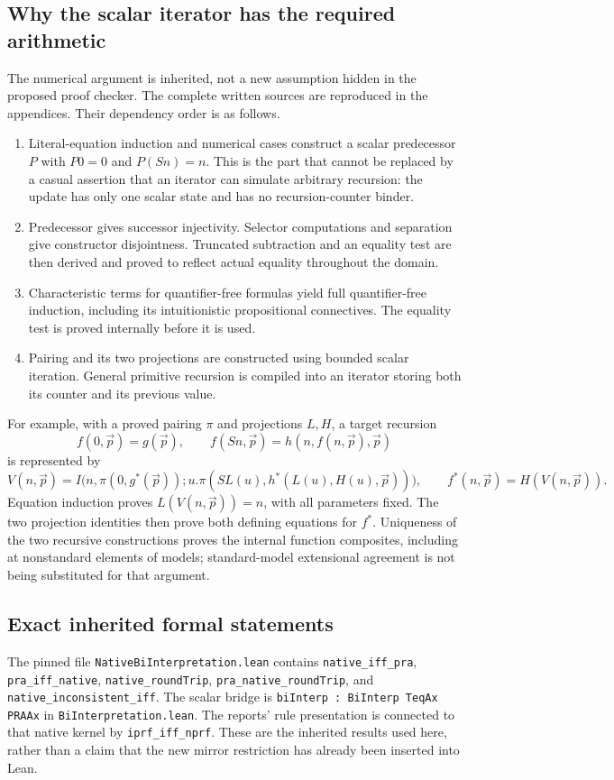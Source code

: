 \subsection{Why the scalar iterator has the required arithmetic}
The numerical argument is inherited, not a new assumption hidden in
the proposed proof checker.  The complete written sources are
reproduced in the appendices.  Their dependency order is as follows.
\begin{enumerate}
\item Literal-equation induction and numerical cases construct a
scalar predecessor $P$ with $P0=0$ and $P(Sn)=n$.  This is the part
that cannot be replaced by a casual assertion that an iterator can
simulate arbitrary recursion: the update has only one scalar state
and has no recursion-counter binder.
\item Predecessor gives successor injectivity.  Selector computations
and separation give constructor disjointness.  Truncated subtraction
and an equality test are then derived and proved to reflect actual
equality throughout the domain.
\item Characteristic terms for quantifier-free formulas yield full
quantifier-free induction, including its intuitionistic propositional
connectives.  The equality test is proved internally before it is used.
\item Pairing and its two projections are constructed using bounded
scalar iteration.  General primitive recursion is compiled into an
iterator storing both its counter and its previous value.
\end{enumerate}
For example, with a proved pairing $\pi$ and projections $L,H$, a
target recursion
\[
 f(0,\vec p)=g(\vec p),\qquad
 f(Sn,\vec p)=h(n,f(n,\vec p),\vec p)
\]
is represented by
\[
 V(n,\vec p)=I\bigl(n,\pi(0,g^*(\vec p));
   u.\pi(SL(u),h^*(L(u),H(u),\vec p))\bigr),
 \qquad f^*(n,\vec p)=H(V(n,\vec p)).
\]
Equation induction proves $L(V(n,\vec p))=n$, with all parameters
fixed.  The two projection identities then prove both defining
equations for $f^*$.  Uniqueness of the two recursive constructions
proves the internal function composites, including at nonstandard
elements of models; standard-model extensional agreement is not being
substituted for that argument.

\subsection{Exact inherited formal statements}
The pinned file \texttt{NativeBiInterpretation.lean} contains
\texttt{native\_iff\_pra}, \texttt{pra\_iff\_native},
\texttt{native\_roundTrip}, \texttt{pra\_native\_roundTrip}, and
\texttt{native\_inconsistent\_iff}.  The scalar bridge is
\texttt{biInterp : BiInterp TeqAx PRAAx} in
\texttt{BiInterpretation.lean}.  The reports' rule presentation is
connected to that native kernel by \texttt{iprf\_iff\_nprf}.
These are the inherited results used here, rather than a claim that
the new mirror restriction has already been inserted into Lean.

